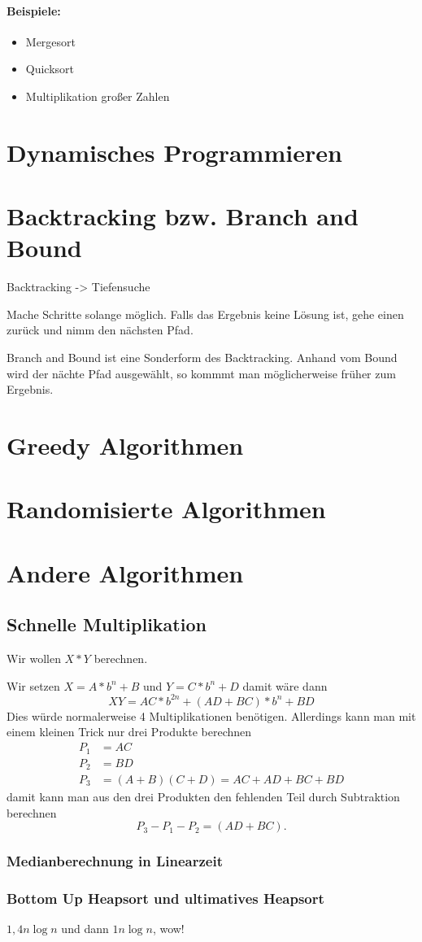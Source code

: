\paragraph{Beispiele:}
\begin{itemize}
	\item Mergesort
	\item Quicksort
	\item Multiplikation großer Zahlen
\end{itemize}

\section{Dynamisches Programmieren}
\section{Backtracking bzw. Branch and Bound}
Backtracking -> Tiefensuche

Mache Schritte solange möglich. Falls das Ergebnis keine Lösung ist, gehe einen zurück und nimm den nächsten Pfad.


Branch and Bound ist eine Sonderform des Backtracking. Anhand vom Bound wird der nächte Pfad ausgewählt, so kommmt man möglicherweise früher zum Ergebnis.

\section{Greedy Algorithmen}
\section{Randomisierte Algorithmen}

\section{Andere Algorithmen}
\subsection{Schnelle Multiplikation}
Wir wollen $X*Y$ berechnen.

Wir setzen $X=A*b^n+B$ und $Y=C*b^n+D$ damit wäre dann
\begin{equation*}
	XY=AC*b^{2n}+(AD+BC)*b^n+BD
\end{equation*}
Dies würde normalerweise 4 Multiplikationen benötigen. Allerdings kann man mit einem kleinen Trick nur drei Produkte berechnen
\begin{align*}
	P_1&=AC\\
	P_2&=BD\\
	P_3&=(A+B)(C+D)=AC+AD+BC+BD
\end{align*}
damit kann man aus den drei Produkten den fehlenden Teil durch Subtraktion berechnen
\begin{equation*}
	P_3-P_1-P_2=(AD+BC).
\end{equation*}

\subsubsection{Medianberechnung in Linearzeit}
\subsubsection{Bottom Up Heapsort und ultimatives Heapsort}
$1,4n\log n$ und dann $1n\log n$, wow!





